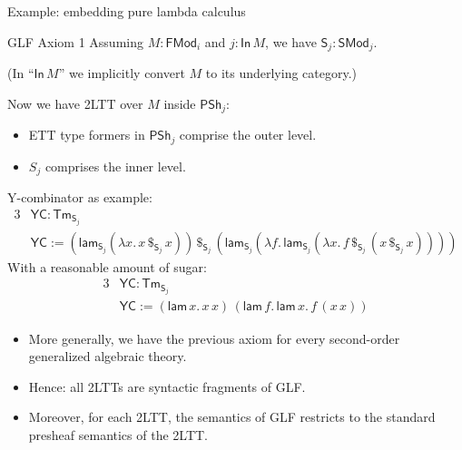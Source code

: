 \documentclass[dvipsnames,aspectratio=169]{beamer}
\newcommand{\ms}[1]{\mathsf{#1}}
\newcommand{\Tm}{\mathsf{Tm}}
\newcommand{\In}{\mathsf{In}}
\newcommand{\PSh}{\mathsf{PSh}}
\newcommand{\SMod}{\mathsf{SMod}}
\newcommand{\FMod}{\mathsf{FMod}}
\renewcommand{\S}{\mathsf{S}}
\newcommand{\lam}{\ms{lam}}
\begin{document}
\begin{frame}{Example: embedding pure lambda calculus}

\begin{block}{GLF Axiom 1}
  Assuming $M : \FMod_i$ and $j : \In\,M$, we have $\S_j : \SMod_j$.

  {\footnotesize (In ``$\In\,M$'' we implicitly convert $M$ to its underlying category.)}
\end{block}
\vspace{0.5em}

Now we have 2LTT over $M$ inside $\PSh_j$:
\begin{itemize}
\item ETT type formers in $\PSh_j$ comprise the outer level.
\item $S_j$ comprises the inner level.
\end{itemize}
\vspace{0.5em}

Y-combinator as example:
\begin{alignat*}{3}
  & \ms{YC} : \Tm_{\S_j} \\
  & \ms{YC} := (\lam_{\S_j} (\lambda x.\, x\,\$_{\S_j}\,x))\,\$_{\S_j}\,
               (\lam_{\S_j} (\lambda f.\,\lam_{\S_j} (\lambda x.\, f \,\$_{\S_j}\, (x \,\$_{\S_j}\, x))))
\end{alignat*}
With a reasonable amount of sugar:
\begin{alignat*}{3}
  & \ms{YC} : \Tm_{\S_j} \\
  & \ms{YC} := (\lam\,x.\,x\,x)\,(\lam\,f.\,\lam\,x.\,f\,(x\,x))
\end{alignat*}

\end{frame}

\begin{frame}{}

\begin{itemize}
\item More generally, we have the previous axiom for every second-order generalized algebraic theory.
\item Hence: all 2LTTs are syntactic fragments of GLF.
\item Moreover, for each 2LTT, the semantics of GLF restricts to the standard presheaf semantics of the 2LTT.
\end{itemize}


\end{frame}
\end{document}
